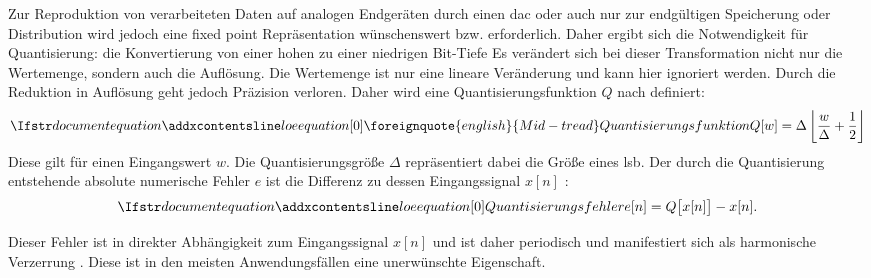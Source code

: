 Zur Reproduktion von verarbeiteten Daten auf analogen Endgeräten durch einen \gls{dac} oder auch nur zur endgültigen Speicherung oder Distribution wird jedoch eine \gls{fixed point} Repräsentation wünschenswert bzw. erforderlich.
Daher ergibt sich die Notwendigkeit für Quantisierung: die Konvertierung von einer hohen zu einer niedrigen Bit-Tiefe \autocite[S. 499]{dither}
Es verändert sich bei dieser Transformation nicht nur die Wertemenge, sondern auch die Auflösung.
Die Wertemenge ist nur eine lineare Veränderung und kann hier ignoriert werden.
Durch die Reduktion in Auflösung geht jedoch Präzision verloren.
Daher wird eine Quantisierungsfunktion $Q$ nach \citeauthor{dither} \autocite[S. 500]{dither} definiert:
\begin{equation}
    \setequationentry{\foreignquote{english}{Mid-tread} Quantisierungsfunktion}
    \label{eq:quantizer}
    Q[w] = \Delta \left\lfloor \frac{w}{\Delta} + \frac{1}{2} \right\rfloor
\end{equation}
Diese gilt für einen Eingangswert $w$.
Die Quantisierungsgröße $\Delta$ repräsentiert dabei die Größe eines \gls{lsb}.
Der durch die Quantisierung entstehende absolute numerische Fehler $e$ ist die Differenz zu dessen Eingangssignal $x[n]$ \autocite[S. 500]{dither}:
\begin{equation}
\setequationentry{Quantisierungsfehler}
e[n] = Q\bigl[x[n]\bigr] - x[n].
\end{equation}

Dieser Fehler ist in direkter Abhängigkeit zum Eingangssignal $x[n]$ und ist daher periodisch und manifestiert sich als harmonische Verzerrung \autocite[S. 500]{dither}\autocite[S. 147]{noise-shaping}.
Diese ist in den meisten Anwendungsfällen eine unerwünschte Eigenschaft.

